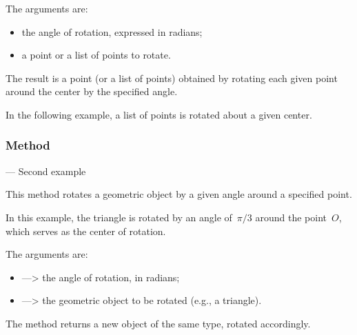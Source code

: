 \medskip
\noindent
The arguments are:
\begin{itemize}
  \item the angle of rotation, expressed in radians;
  \item a point or a list of points to rotate.
\end{itemize}

\noindent
The result is a point (or a list of points) obtained by rotating each given point around the center by the specified angle.

\medskip
\noindent
In the following example, a list of points is rotated about a given center.

\vspace{1em}

\begin{tkzexample}[latex=7cm]
\begin{center}
\end{center}
\end{tkzexample}

\subsubsection{Method } — Second example %
\label{ssub:object_rotation}

This method rotates a geometric object by a given angle around a specified point.

\medskip
\noindent
In this example, the triangle is rotated by an angle of~$\pi/3$ around the point~$O$, which serves as the center of rotation.

\medskip
\noindent
The arguments are:
\begin{itemize}
  \item {} —> the angle of rotation, in radians;
  \item {} —> the geometric object to be rotated (e.g., a triangle).
\end{itemize}

\noindent
The method returns a new object of the same type, rotated accordingly.

